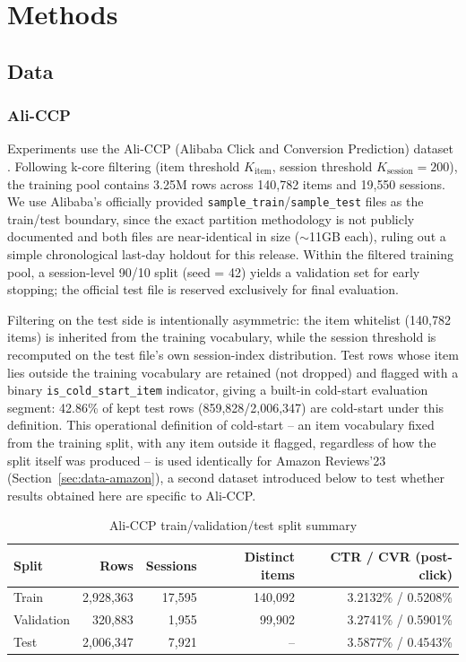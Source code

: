 \documentclass{uclthesis}
\begin{document}
\chapter{Methods}
\label{chap:methods}

\section{Data}
\label{sec:data}

\subsection{Ali-CCP}
\label{sec:data-aliccp}

Experiments use the Ali-CCP (Alibaba Click and Conversion Prediction) dataset \citep{ma2018esmm}. Following k-core filtering (item threshold $K_{\text{item}}$, session threshold $K_{\text{session}}=200$), the training pool contains 3.25M rows across 140{,}782 items and 19{,}550 sessions. We use Alibaba's officially provided \texttt{sample\_train}/\texttt{sample\_test} files as the train/test boundary, since the exact partition methodology is not publicly documented and both files are near-identical in size ($\sim$11GB each), ruling out a simple chronological last-day holdout for this release. Within the filtered training pool, a session-level 90/10 split (seed = 42) yields a validation set for early stopping; the official test file is reserved exclusively for final evaluation.

Filtering on the test side is intentionally asymmetric: the item whitelist (140{,}782 items) is inherited from the training vocabulary, while the session threshold is recomputed on the test file's own session-index distribution. Test rows whose item lies outside the training vocabulary are retained (not dropped) and flagged with a binary \texttt{is\_cold\_start\_item} indicator, giving a built-in cold-start evaluation segment: 42.86\% of kept test rows (859{,}828/2{,}006{,}347) are cold-start under this definition. This operational definition of cold-start -- an item vocabulary fixed from the training split, with any item outside it flagged, regardless of how the split itself was produced -- is used identically for Amazon Reviews'23 (Section~\ref{sec:data-amazon}), a second dataset introduced below to test whether results obtained here are specific to Ali-CCP.

\begin{table}[h]
\centering
\caption{Ali-CCP train/validation/test split summary}
\label{tab:split-summary}
\begin{tabular}{lrrrr}
\toprule
Split & Rows & Sessions & Distinct items & CTR / CVR (post-click) \\
\midrule
Train       & 2{,}928{,}363 & 17{,}595 & 140{,}092 & 3.2132\% / 0.5208\% \\
Validation  & 320{,}883     & 1{,}955  & 99{,}902  & 3.2741\% / 0.5901\% \\
Test        & 2{,}006{,}347 & 7{,}921  & --        & 3.5877\% / 0.4543\% \\
\bottomrule
\end{tabular}
\end{table}
\end{document}
